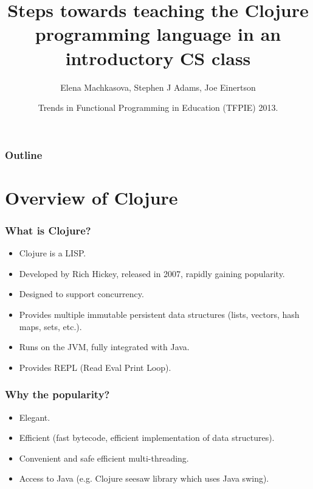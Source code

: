 \documentclass{beamer}
\newcommand{\allcomments}[1]{{#1}}
\newcommand{\joecomment}[1]{{\bf \color{JoesGold}{\allcomments{{#1}}}}}
\begin{document}
\title{Steps towards teaching the Clojure programming language in an introductory CS  class}
\author{Elena Machkasova, Stephen J Adams, Joe Einertson}
\date[May 13, 2013]  
{Trends in Functional Programming in Education (TFPIE) 2013.}

\begin{frame}
  \titlepage
\end{frame}

\begin{frame}

  \frametitle{Outline}
\tableofcontents
\end{frame}

\section{Overview of Clojure}

\begin{frame}
\frametitle{What is Clojure?}
\begin{itemize}
\item Clojure is a LISP.
\item Developed by Rich Hickey, released in 2007, rapidly gaining popularity. 
\item Designed to support concurrency. %
\item Provides multiple immutable persistent data structures (lists, vectors, hash maps, sets, etc.).
\item Runs on the JVM, fully integrated with Java. 
\item Provides REPL (Read Eval Print Loop).
\end{itemize}
\end{frame}

\begin{frame}
\frametitle{Why the popularity?}
\begin{itemize}
\item Elegant.
\item Efficient (fast bytecode, efficient implementation of data structures).
\item Convenient and safe efficient multi-threading. 
\item Access to Java (e.g. Clojure seesaw library which uses Java swing). 
\end{itemize}
\end{frame}
\end{document}
